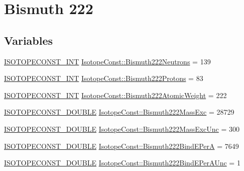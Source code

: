 \hypertarget{group___isotope_const-_bismuth-_bi222}{}\section{Bismuth 222}
\label{group___isotope_const-_bismuth-_bi222}
\subsection*{Variables}
\begin{DoxyCompactItemize}
\item 
\mbox{\hyperlink{group___isotope_const-_macros_ga5f18360b3e99483a35c32d789e62621c}{I\+S\+O\+T\+O\+P\+E\+C\+O\+N\+S\+T\+\_\+\+I\+NT}} \mbox{\hyperlink{group___isotope_const-_bismuth-_bi222_gab4371b4c44b4619464758a643f7c3c33}{Isotope\+Const\+::\+Bismuth222\+Neutrons}} = 139
\item 
\mbox{\hyperlink{group___isotope_const-_macros_ga5f18360b3e99483a35c32d789e62621c}{I\+S\+O\+T\+O\+P\+E\+C\+O\+N\+S\+T\+\_\+\+I\+NT}} \mbox{\hyperlink{group___isotope_const-_bismuth-_bi222_ga317608e9ce9f019407d7f49b6dd18f96}{Isotope\+Const\+::\+Bismuth222\+Protons}} = 83
\item 
\mbox{\hyperlink{group___isotope_const-_macros_ga5f18360b3e99483a35c32d789e62621c}{I\+S\+O\+T\+O\+P\+E\+C\+O\+N\+S\+T\+\_\+\+I\+NT}} \mbox{\hyperlink{group___isotope_const-_bismuth-_bi222_ga677251ada977875e748df24f46b1451c}{Isotope\+Const\+::\+Bismuth222\+Atomic\+Weight}} = 222
\item 
\mbox{\hyperlink{group___isotope_const-_macros_ga8f45a7272ce02c0b4c65c44636ed719a}{I\+S\+O\+T\+O\+P\+E\+C\+O\+N\+S\+T\+\_\+\+D\+O\+U\+B\+LE}} \mbox{\hyperlink{group___isotope_const-_bismuth-_bi222_gaa60032eafb8dafa8b4984a26e6ffdb2e}{Isotope\+Const\+::\+Bismuth222\+Mass\+Exc}} = 28729
\item 
\mbox{\hyperlink{group___isotope_const-_macros_ga8f45a7272ce02c0b4c65c44636ed719a}{I\+S\+O\+T\+O\+P\+E\+C\+O\+N\+S\+T\+\_\+\+D\+O\+U\+B\+LE}} \mbox{\hyperlink{group___isotope_const-_bismuth-_bi222_ga7101ecbd4cc56aa9df466b0156a5aefd}{Isotope\+Const\+::\+Bismuth222\+Mass\+Exc\+Unc}} = 300
\item 
\mbox{\hyperlink{group___isotope_const-_macros_ga8f45a7272ce02c0b4c65c44636ed719a}{I\+S\+O\+T\+O\+P\+E\+C\+O\+N\+S\+T\+\_\+\+D\+O\+U\+B\+LE}} \mbox{\hyperlink{group___isotope_const-_bismuth-_bi222_ga32d8bc43421bccf1e84380bed6d4f68a}{Isotope\+Const\+::\+Bismuth222\+Bind\+E\+PerA}} = 7649
\item 
\mbox{\hyperlink{group___isotope_const-_macros_ga8f45a7272ce02c0b4c65c44636ed719a}{I\+S\+O\+T\+O\+P\+E\+C\+O\+N\+S\+T\+\_\+\+D\+O\+U\+B\+LE}} \mbox{\hyperlink{group___isotope_const-_bismuth-_bi222_gae6b2658cc157ceb3cf63345ed01ead45}{Isotope\+Const\+::\+Bismuth222\+Bind\+E\+Per\+A\+Unc}} = 1

\end{DoxyCompactItemize}
